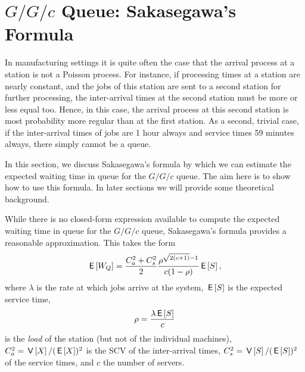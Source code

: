 \section{$G/G/c$ Queue: Sakasegawa's Formula}
\label{sec:gg1}


In manufacturing settings it is quite often the case that the arrival process at a station is not a Poisson process.
For instance, if processing times at a station are nearly constant, and the jobs of this station are sent to a second station for further processing, the inter-arrival times at the second station must be more or less equal too.
Hence, in this case, the arrival process at this  second station is most probability more regular than at the first station.
As a second, trivial case, if the inter-arrival times of jobs are 1 hour always and service times 59 minutes always, there simply cannot be a queue.

In this section, we discuss Sakasegawa's formula by which we can estimate the expected waiting time in queue for the $G/G/c$ queue.
The aim here is to show how to use this formula.
In later sections we will provide some theoretical background.




While there is no closed-form expression available to compute the expected waiting time in queue for the $G/G/c$ queue, Sakasegawa's formula provides a reasonable approximation. This takes the form
\begin{equation}\label{eq:7}
 \,\mathsf{E}\left[W_Q\right] = \frac{C_a^2+C_s^2}2 \frac{\rho^{\sqrt{2(c+1)}-1}}{c(1-\rho)} \,\mathsf{E}\left[S\right],
\end{equation}
where $\lambda$ is the rate at which jobs arrive at the system, $\,\mathsf{E}\left[S\right]$ is the expected service time, 
\begin{equation*}
 \rho = \frac{\lambda \,\mathsf{E}\left[S\right]}{c}
\end{equation*}
is the \emph{load} of the station (but not of the individual machines), $C_a^2 = \,\mathsf{V}\left[X\right]/(\,\mathsf{E}\left[X\right])^2$ is the SCV of the inter-arrival times, $C_s^2=\,\mathsf{V}\left[S\right]/(\,\mathsf{E}\left[S\right])^2$ of the service times, and $c$ the number of servers.


